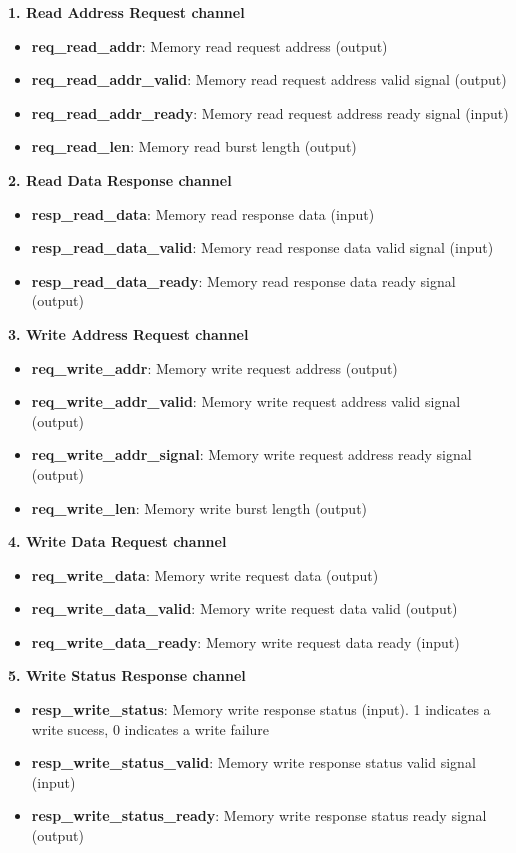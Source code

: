 \documentclass[11pt]{article}
\begin{document}
\textbf{1. Read Address Request channel}
\begin{itemize}
\item \textbf{req\_read\_addr}: Memory read request address (output)
\item \textbf{req\_read\_addr\_valid}: Memory read request address valid signal (output)
\item \textbf{req\_read\_addr\_ready}: Memory read request address ready signal (input)
\item \textbf{req\_read\_len}: Memory read burst length (output)
\end{itemize}

\textbf{2. Read Data Response channel}
\begin{itemize}
\item \textbf{resp\_read\_data}: Memory read response data (input)
\item \textbf{resp\_read\_data\_valid}: Memory read response data valid signal (input)
\item \textbf{resp\_read\_data\_ready}: Memory read response data ready signal (output)
\end{itemize}

\textbf{3. Write Address Request channel}
\begin{itemize}
\item \textbf{req\_write\_addr}: Memory write request address (output)
\item \textbf{req\_write\_addr\_valid}: Memory write request address valid signal (output)
\item \textbf{req\_write\_addr\_signal}: Memory write request address ready signal (output)
\item \textbf{req\_write\_len}: Memory write burst length (output)
\end{itemize}

\textbf{4. Write Data Request channel}
\begin{itemize}
\item \textbf{req\_write\_data}: Memory write request data (output)
\item \textbf{req\_write\_data\_valid}: Memory write request data valid (output)
\item \textbf{req\_write\_data\_ready}: Memory write request data ready (input)
\end{itemize}

\textbf{5. Write Status Response channel}
\begin{itemize}
\item \textbf{resp\_write\_status}: Memory write response status (input). 1 indicates a write sucess, 0 indicates a write failure
\item \textbf{resp\_write\_status\_valid}: Memory write response status valid signal (input)
\item \textbf{resp\_write\_status\_ready}: Memory write response status ready signal (output)
\end{itemize}
\end{document}
